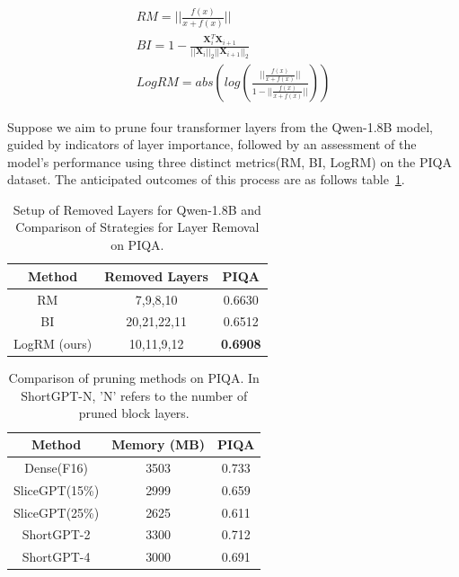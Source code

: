 \documentclass[conference]{IEEEtran}
\begin{document}
\begin{gather}
RM = ||\frac{f(x)}{x+f(x)}||  \\
BI = 1 - \frac{\mathbf{X}_i^T\mathbf{X}_{i+1}}{||\mathbf{X}_i||_2 ||\mathbf{X}_{i+1}||_2} \\
LogRM = abs(log(\frac{||\frac{f(x)}{x+f(x)}||}{1 - ||\frac{f(x)}{x+f(x)}||}))
\label{eq:log_rm}
\end{gather}

Suppose we aim to prune four transformer layers from the Qwen-1.8B model, guided by indicators of layer importance, followed by an assessment of the model's performance using three distinct metrics(RM, BI, LogRM) on the PIQA dataset. The anticipated outcomes of this process are as follows table~\ref{tab:import_index}.

\begin{table}[htbp]
\caption{Setup of Removed Layers for Qwen-1.8B and Comparison of Strategies for Layer Removal on PIQA.}
\begin{center}
\begin{tabular}{|c|c|c|}
\hline
Method & Removed Layers & PIQA \\ \hline
RM ~\cite{rm_Samragh_Farajtabar_Mehta_Vemulapalli_Faghri_Naik_Tuzel_Apple} & 7,9,8,10 & 0.6630 \\ \hline
BI ~\cite{shortgpt_Men_Xu_Zhang_Wang_Lin_Lu_Han_Chen} & 20,21,22,11 & 0.6512 \\ \hline
LogRM (ours) & 10,11,9,12 & \textbf{0.6908} \\ \hline
\end{tabular}
\label{tab:import_index}
\end{center}
\end{table}

\begin{table}[tbp]
\caption{Comparison of pruning methods on PIQA. In ShortGPT-N, 'N' refers to the number of pruned block layers.}
\begin{center}
\begin{tabular}{|c|c|c|}
\hline
Method & Memory (MB) & PIQA \\ \hline
Dense(F16) & 3503 & 0.733 \\ \hline
SliceGPT(15\%) & 2999 & 0.659 \\ \hline
SliceGPT(25\%) & 2625 & 0.611 \\ \hline
ShortGPT-2 & 3300 & 0.712 \\ \hline
ShortGPT-4 & 3000 & 0.691 \\ \hline
\end{tabular}
\label{tab:pruning_method}
\end{center}
\end{table}
\end{document}
